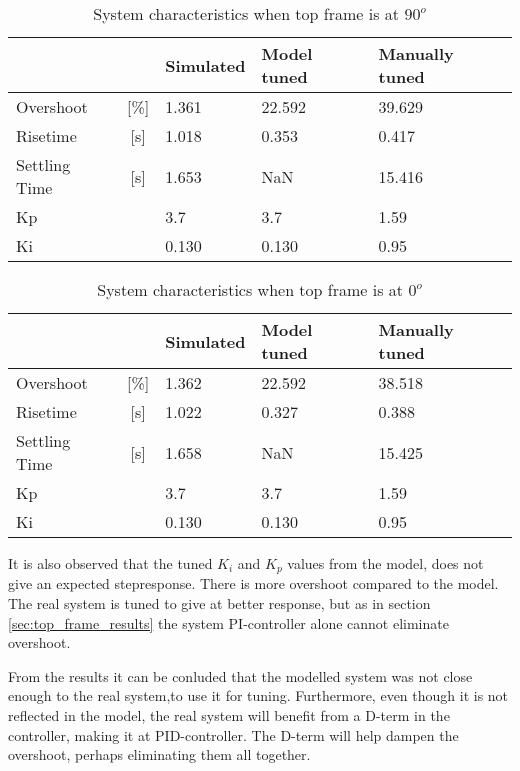 \documentclass[../../Main]{subfiles}
\begin{document}
\begin{table}[H]
	\centering
	\begin{tabular}{lc|*{3}{l}}
		&&Simulated&Model tuned&Manually tuned\\
		\hline
		Overshoot&[\%]&1.361&22.592&39.629\\
		Risetime&[\si{s}]& 1.018&0.353&0.417\\
		Settling Time&[\si{s}]& 1.653&NaN& 15.416\\
		Kp&&3.7&3.7&1.59\\
		Ki&&0.130&0.130&0.95
	\end{tabular}
	\caption{System characteristics when top frame is at $90^o$}
	\label{tab:90_bot}
\end{table}

\begin{table}[H]
	\centering
	\begin{tabular}{lc|*{3}{l}}
		&&Simulated&Model tuned&Manually tuned\\
		\hline
		Overshoot&[\%]&1.362&22.592&38.518\\
		Risetime&[\si{s}]&1.022&0.327&0.388\\
		Settling Time&[\si{s}]&1.658&NaN&15.425\\
		Kp&&3.7&3.7&1.59\\
		Ki&&0.130&0.130&0.95
	\end{tabular}
	\caption{System characteristics when top frame is at $0^o$}
	\label{tab:0_bot}
\end{table}

It is also observed that the tuned $K_i$ and $K_p$ values from the model, does not give an expected stepresponse. There is more overshoot compared to the model. The real system is tuned to give at better response, but as in section \ref{sec:top_frame_results} the system PI-controller alone cannot eliminate overshoot.

From the results it can be conluded that the modelled system was not close enough to the real system,to use it for tuning. Furthermore, even though it is not reflected in the model, the real system will benefit from a D-term in the controller, making it at PID-controller. The D-term will help dampen the overshoot, perhaps eliminating them all together. 
\end{document}
